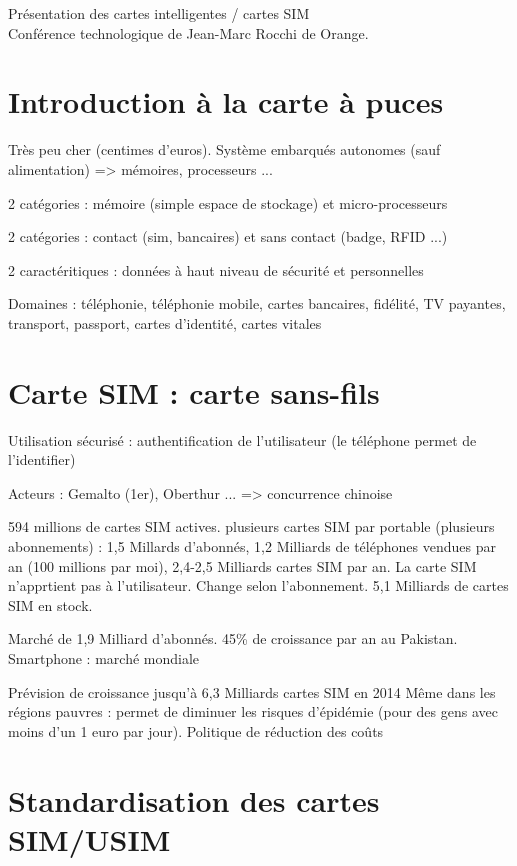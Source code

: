 \documentclass[a4paper,12pt]{article}
\begin{document}
\begin{center}
\Large{Présentation des cartes intelligentes / cartes SIM}\\
\vspace{0.4cm}
\normalsize{Conférence technologique de Jean-Marc Rocchi de Orange.}\\
\end{center}

\section{Introduction à la carte à puces}

Très peu cher (centimes d'euros).
Système embarqués autonomes (sauf alimentation) => mémoires, processeurs ...

2 catégories : mémoire (simple espace de stockage) et micro-processeurs

2 catégories : contact (sim, bancaires) et sans contact (badge, RFID ...)

2 caractéritiques : données à haut niveau de sécurité et personnelles

Domaines : téléphonie, téléphonie mobile, cartes bancaires, fidélité, TV payantes, transport, passport, cartes d'identité, cartes vitales

\section{Carte SIM : carte sans-fils}

Utilisation sécurisé : authentification de l'utilisateur (le téléphone permet de l'identifier)

Acteurs : Gemalto (1er), Oberthur ... => concurrence chinoise

594 millions de cartes SIM actives. plusieurs cartes SIM par portable (plusieurs abonnements) : 1,5 Millards d'abonnés, 1,2 Milliards de téléphones vendues par an (100 millions par moi), 2,4-2,5 Milliards cartes SIM par an.
La carte SIM n'apprtient pas à l'utilisateur.
Change selon l'abonnement. 5,1 Milliards de cartes SIM en stock.

Marché de 1,9 Milliard d'abonnés. 45\% de croissance par an au Pakistan.
Smartphone : marché mondiale

Prévision de croissance jusqu'à 6,3 Milliards cartes SIM en 2014
Même dans les régions pauvres : permet de diminuer les risques d'épidémie (pour des gens avec moins d'un 1 euro par jour).
Politique de réduction des coûts

\section{Standardisation des cartes SIM/USIM}
\end{document}
